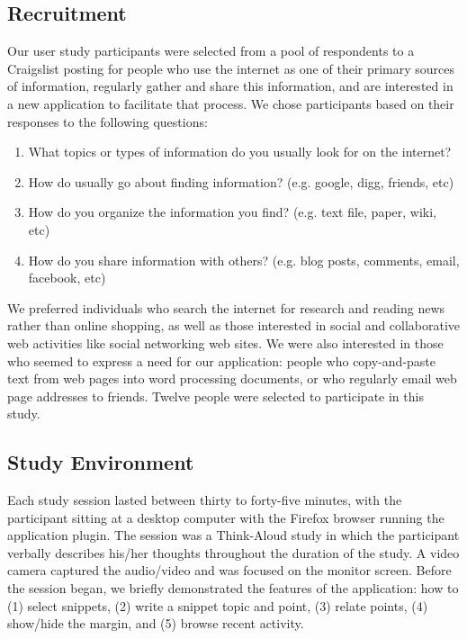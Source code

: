 \documentclass{chi2009}
\begin{document}
\subsection{Recruitment}
Our user study participants were selected from a pool of respondents to a Craigslist posting for people who use the internet as one of their primary sources of information, regularly gather and share this information, and are interested in a new application to facilitate that process. We chose participants based on their responses to the following questions:
\begin{enumerate}
	\item What topics or types of information do you usually look for on the internet?
	\item How do usually go about finding information? (e.g. google, digg, friends, etc)
	\item How do you organize the information you find? (e.g. text file, paper, wiki, etc)
	\item How do you share information with others? (e.g. blog posts, comments, email, facebook, etc)
\end{enumerate}
We preferred individuals who search the internet for research and reading news rather than online shopping, as well as those interested in social and collaborative web activities like social networking web sites.  We were also interested in those who seemed to express a need for our application: people who copy-and-paste text from web pages into word processing documents, or who regularly email web page addresses to friends. Twelve people were selected to participate in this study.

\subsection{Study Environment}
Each study session lasted between thirty to forty-five minutes, with the participant sitting at a desktop computer with the Firefox browser running the application plugin. The session was a Think-Aloud study in which the participant verbally describes his/her thoughts throughout the duration of the study. A video camera captured the audio/video and was focused on the monitor screen. Before the session began, we briefly demonstrated the features of the application: how to (1) select snippets, (2) write a snippet topic and point, (3) relate points, (4) show/hide the margin, and (5) browse recent activity.
\end{document}
